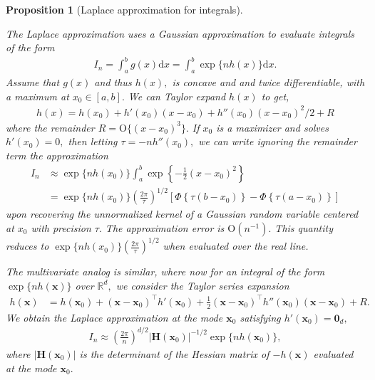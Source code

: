 \documentclass[
  11pt,
  letterpaper,
]{scrbook}
\theoremstyle{definition}
\theoremstyle{plain}
\newtheorem{proposition}{Proposition}[chapter]
\theoremstyle{plain}
\theoremstyle{plain}
\theoremstyle{definition}
\theoremstyle{definition}
\theoremstyle{plain}
\newtheorem{proposition}{Proposition}[chapter]
\theoremstyle{plain}
\theoremstyle{remark}
\begin{document}
\begin{proposition}[Laplace approximation for
integrals]\protect\hypertarget{prp-Laplace-approximation}{}\label{prp-Laplace-approximation}

The Laplace approximation uses a Gaussian approximation to evaluate
integrals of the form \begin{align*}
I_n= \int_a^b g(x) \mathrm{d} x =\int_a^b  \exp\{nh(x)\}\mathrm{d} x.
\end{align*} Assume that \(g(x)\) and thus \(h(x),\) is concave and and
twice differentiable, with a maximum at \(x_0 \in [a,b].\) We can Taylor
expand \(h(x)\) to get, \begin{align*}
h(x) = h(x_0) + h'(x_0)(x-x_0) + h''(x_0)(x-x_0)^2/2 + R
\end{align*} where the remainder \(R=\mathrm{O}\{(x-x_0)^3\}.\) If
\(x_0\) is a maximizer and solves \(h'(x_0)=0,\) then letting
\(\tau=-nh''(x_0),\) we can write ignoring the remainder term the
approximation \begin{align*}
 I_n &\approx \exp\{nh(x_0)\} \int_{a}^b \exp \left\{-\frac{1}{2}(x-x_0)^2\right\}
  \\&= \exp\{nh(x_0)\} \left(\frac{2\pi}{\tau}\right)^{1/2} \left[\Phi\left\{ \tau(b-x_0)\right\} - \Phi\left\{\tau(a-x_0)\right\}\right]
\end{align*} upon recovering the unnormalized kernel of a Gaussian
random variable centered at \(x_0\) with precision \(\tau.\) The
approximation error is \(\mathrm{O}(n^{-1}).\) This quantity reduces to
\(\exp\{nh(x_0)\} \left(\frac{2\pi}{\tau}\right)^{1/2}\) when evaluated
over the real line.

The multivariate analog is similar, where now for an integral of the
form \(\exp\{nh(\boldsymbol{x})\}\) over \(\mathbb{R}^d,\) we consider
the Taylor series expansion \begin{align*}
 h(\boldsymbol{x}) &= h(\boldsymbol{x}_0) + (\boldsymbol{x}- \boldsymbol{x}_0)^\top h'(\boldsymbol{x}_0) + \frac{1}{2}(\boldsymbol{x}- \boldsymbol{x}_0)^\top h''(\boldsymbol{x}_0)(\boldsymbol{x}- \boldsymbol{x}_0) + R.
\end{align*} We obtain the Laplace approximation at the mode
\(\boldsymbol{x}_0\) satisfying
\(h'(\boldsymbol{x}_0)=\boldsymbol{0}_d,\) \begin{align*}
 I_n \approx \left(\frac{2\pi}{n}\right)^{d/2} | \mathbf{H}(\boldsymbol{x}_0)|^{-1/2}\exp\{nh(\boldsymbol{x}_0)\},
\end{align*} where \(|\mathbf{H}(\boldsymbol{x}_0)|\) is the determinant
of the Hessian matrix of \(-h(\boldsymbol{x})\) evaluated at the mode
\(\boldsymbol{x}_0.\)

\end{proposition}
\end{document}
